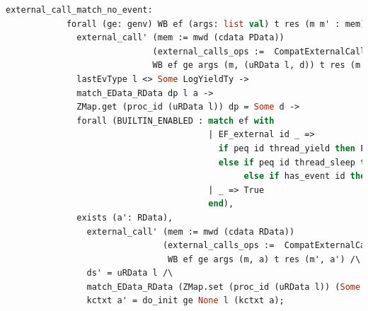 \begin{lstlisting}[language=Caml]     
          external_call_match_no_event:
            forall (ge: genv) WB ef (args: list val) t res (m m' : mem) l d d' ds' (dp : EData) (a: RData),
              external_call' (mem := mwd (cdata PData)) 
                             (external_calls_ops :=  CompatExternalCalls.compatlayer_extcall_ops (LH <@$\oplus$@> L64))
                             WB ef ge args (m, (uRData l, d)) t res (m', (ds', d')) ->
              lastEvType l <> Some LogYieldTy ->
              match_EData_RData dp l a ->
              ZMap.get (proc_id (uRData l)) dp = Some d ->
              forall (BUILTIN_ENABLED : match ef with
                                        | EF_external id _ => 
                                          if peq id thread_yield then False
                                          else if peq id thread_sleep then False
                                               else if has_event id then False else True
                                        | _ => True
                                        end),
              exists (a': RData),
                external_call' (mem := mwd (cdata RData)) 
                               (external_calls_ops :=  CompatExternalCalls.compatlayer_extcall_ops (pbthread  <@$\oplus$@>  L64))
                                WB ef ge args (m, a) t res (m', a') /\
                ds' = uRData l /\
                match_EData_RData (ZMap.set (proc_id (uRData l)) (Some d') dp) l a' /\
                kctxt a' = do_init ge None l (kctxt a);
\end{lstlisting}
         

